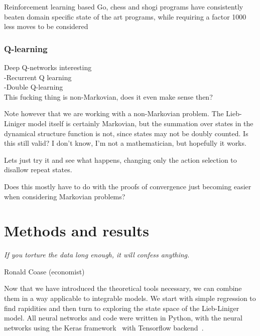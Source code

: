 \documentclass[11pt, a4paper]{report} %
\begin{document}
Reinforcement learning based Go, chess and shogi programs have consistently beaten domain specific state of the art programs, while requiring a factor 1000 less moves to be considered~\cite{Silver2017}



\subsection{Q-learning}

Deep Q-networks interesting\cite{mnih13_playin_atari_with_deep_reinf_learn}\\
-Recurrent Q learning\cite{hausknecht15_deep_recur_q_learn_partial_obser_mdps}\\
-Double Q-learning\cite{hasselt15_deep_reinf_learn_with_doubl_q_learn}\\

This fucking thing is non-Markovian, does it even make sense then?

Note however that we are working with a non-Markovian problem.
The Lieb-Liniger model itself is certainly Markovian, but the summation over states in the dynamical structure function is not, since states may not be doubly counted.
Is this still valid?
I don't know, I'm not a mathematician, but hopefully it works.

Lets just try it and see what happens, changing only the action selection to disallow repeat states.

Does this mostly have to do with the proofs of convergence just becoming easier when considering Markovian problems?






\chapter{Methods and results}\label{chap:results}

\epigraph{\textit{If you torture the data long enough, it will confess anything.}}{Ronald Coase (economist)}

Now that we have introduced the theoretical tools necessary, we can combine them in a way applicable to integrable models.
We start with simple regression to find rapidities and then turn to exploring the state space of the Lieb-Liniger model.
All neural networks and code were written in Python, with the neural networks using the Keras framework~\cite{chollet2015keras} with Tensorflow backend~\cite{tensorflow2015-whitepaper}.
\end{document}

